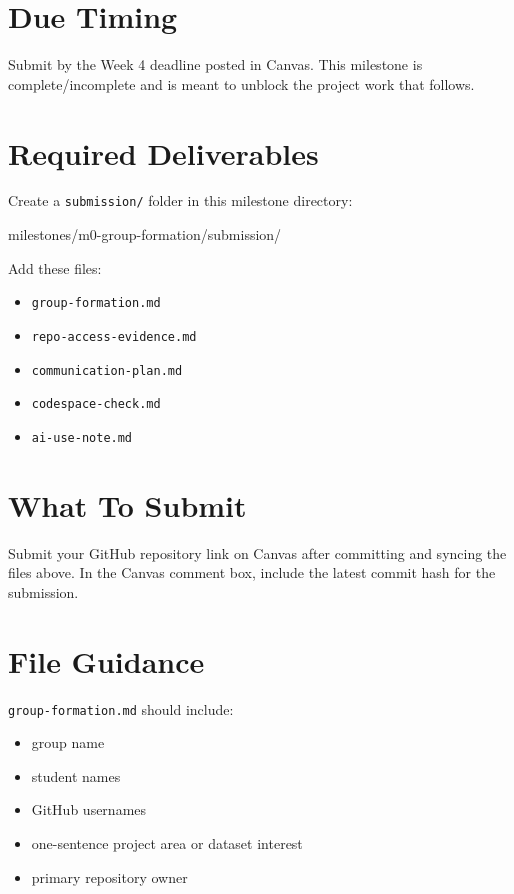 \documentclass[
  letterpaper,
  DIV=11,
  numbers=noendperiod,
  oneside]{scrreprt}
\newenvironment{Shaded}{\begin{snugshade}}{\end{snugshade}}
\newcommand{\NormalTok}[1]{\textcolor[rgb]{0.00,0.23,0.31}{#1}}
\providecommand{\tightlist}{%
  \setlength{\itemsep}{0pt}\setlength{\parskip}{0pt}}
\begin{document}
\section{Due Timing}\label{due-timing}

Submit by the Week 4 deadline posted in Canvas. This milestone is
complete/incomplete and is meant to unblock the project work that
follows.

\section{Required Deliverables}\label{required-deliverables}

Create a \texttt{submission/} folder in this milestone directory:

\begin{Shaded}
\begin{Highlighting}[numbers=left,,]
\NormalTok{milestones/m0{-}group{-}formation/submission/}
\end{Highlighting}
\end{Shaded}

Add these files:

\begin{itemize}
\tightlist
\item
  \texttt{group-formation.md}
\item
  \texttt{repo-access-evidence.md}
\item
  \texttt{communication-plan.md}
\item
  \texttt{codespace-check.md}
\item
  \texttt{ai-use-note.md}
\end{itemize}

\section{What To Submit}\label{what-to-submit}

Submit your GitHub repository link on Canvas after committing and
syncing the files above. In the Canvas comment box, include the latest
commit hash for the submission.

\section{File Guidance}\label{file-guidance}

\texttt{group-formation.md} should include:

\begin{itemize}
\tightlist
\item
  group name
\item
  student names
\item
  GitHub usernames
\item
  one-sentence project area or dataset interest
\item
  primary repository owner
\end{itemize}
\end{document}
